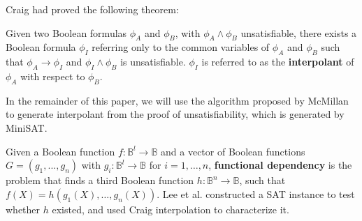 \documentclass[journal]{IEEEtran}
\begin{document}
Craig\cite{Craig} had proved the following theorem:

\begin{theorem}\label{thm_craig}
Given two Boolean formulas $\phi_A$ and $\phi_B$,
with $\phi_A\wedge \phi_B$ unsatisfiable,
there exists a Boolean formula $\phi_I$ referring only
to the common variables of $\phi_A$ and $\phi_B$ such that $\phi_A\to \phi_I$
and $\phi_I\wedge \phi_B$ is unsatisfiable.
$\phi_I$ is referred to as the \textbf{interpolant} of $\phi_A$ with respect to $\phi_B$.
\end{theorem}

In the remainder of this paper,
we will use the algorithm proposed by McMillan\cite{interp_McMillan} to generate interpolant from the proof of unsatisfiability,
which is generated by MiniSAT\cite{EXTSAT}.

Given a Boolean function $f:\mathbb{B}^l\to \mathbb{B}$ and a vector of
Boolean functions $G=(g_1, ..., g_n)$ with $g_i: \mathbb{B}^l\to \mathbb{B}$ for $i =1,\dots ,n$,
\textbf{functional dependency} \cite{funcdep} is the problem that
finds a third Boolean function $h:\mathbb{B}^n\to \mathbb{B}$,
such that $f(X) = h(g_1(X),\dots , g_n(X))$.
Lee et al. \cite{funcdep} constructed a SAT instance to test whether $h$ existed,
and used Craig interpolation \cite{interp_McMillan} to characterize it.


%
\end{document}
